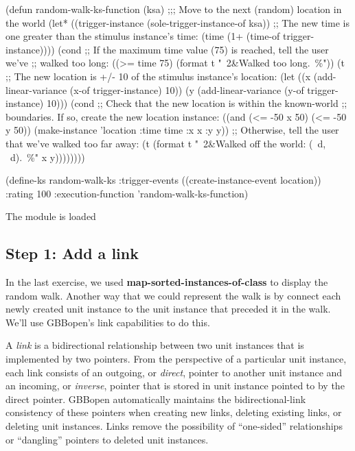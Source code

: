\documentclass[10pt,twoside,english,pdftex]{article}
\begin{document}
\begin{example}
  (defun random-walk-ks-function (ksa)
    ;;; Move to the next (random) location in the world
    (let* ((trigger-instance (sole-trigger-instance-of ksa))
           ;; The new time is one greater than the stimulus instance's time:
           (time (1+ (time-of trigger-instance))))
      (cond
       ;; If the maximum time value (75) is reached, tell the user we've
       ;; walked too long:
       ((>= time 75) (format t "~2&Walked too long.~\%"))
       (t ;; The new location is +/- 10 of the stimulus instance's location:
        (let ((x (add-linear-variance (x-of trigger-instance) 10))
              (y (add-linear-variance (y-of trigger-instance) 10)))
          (cond
           ;; Check that the new location is within the known-world
           ;; boundaries.  If so, create the new location instance:
           ((and (<= -50 x 50) (<= -50 y 50))
            (make-instance 'location 
              :time time 
              :x x 
              :y y))
           ;; Otherwise, tell the user that we've walked too far away:
           (t (format t "~2&Walked off the world: (~d, ~d).~\%" x y))))))))

  (define-ks random-walk-ks
      :trigger-events ((create-instance-event location))
      :rating 100
      :execution-function 'random-walk-ks-function)
\end{example}

\begin{tightitemize}
\item The  module is loaded
\end{tightitemize}

\subsection*{Step 1: Add  a link}

In the last exercise, we used \textbf{map-sorted-instances-of-class} to
display the random walk.  Another way that we could represent the walk is by
connect each newly created  unit instance to the
 unit instance that preceded it in the walk.  We'll use
GBBopen's link capabilities to do this.

A \textit{link} is a bidirectional relationship between two unit instances
that is implemented by two pointers. From the perspective of a particular unit
instance, each link consists of an outgoing, or \textit{direct}, pointer to
another unit instance and an incoming, or \textit{inverse}, pointer that is
stored in unit instance pointed to by the direct pointer.  GBBopen
automatically maintains the bidirectional-link consistency of these pointers
when creating new links, deleting existing links, or deleting unit instances.
Links remove the possibility of ``one-sided'' relationships or ``dangling''
pointers to deleted unit instances.
\end{document}
